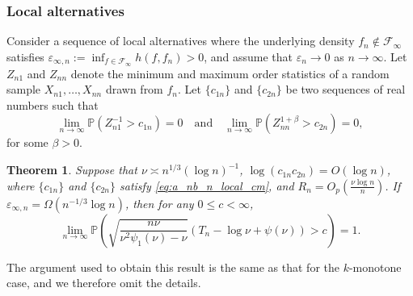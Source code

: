 \documentclass[12pt,letterpaper, twoside, openany]{article}
\theoremstyle{plain}
\newtheorem{theorem}{Theorem}[section]
\begin{document}



	



\subsubsection{Local alternatives}
Consider a sequence of local alternatives where the underlying density $f_n \notin \mathcal{F}_\infty$ satisfies  
$\varepsilon_{\infty,n} := \inf_{f \in \mathcal{F}_\infty} h(f, f_n) > 0$, and assume that $\varepsilon_{n} \to 0$ as $n \to \infty$.  
Let $Z_{n1}$ and $Z_{nn}$ denote the minimum and maximum order statistics of a random sample $X_{n1}, \ldots, X_{nn}$ drawn from $f_n$.  
Let $\{c_{1n}\}$ and $\{c_{2n}\}$ be two sequences of real numbers such that
\begin{equation}\label{eq:a_nb_n_local_cm}
    \lim_{n \to \infty} \mathbb{P}( Z_{n1}^{-1} > c_{1n}) = 0 \quad \text{and} \quad \lim_{n \to \infty} \mathbb{P}(Z_{nn}^{1+\beta} > c_{2n}) = 0,
\end{equation}
for some $\beta > 0$. 

\begin{theorem}\label{coro:c_monotone_H1_local_alt_rate}
    Suppose that $\nu \asymp n^{1/3}(\log n)^{-1}$, $\log (c_{1n} c_{2n}) = O(\log n)$, where $\{c_{1n}\}$ and $\{c_{2n}\}$ satisfy \eqref{eq:a_nb_n_local_cm}, and $R_n = O_p(\frac{\nu \log n}{n})$. If $\varepsilon_{\infty, n} = \Omega(n^{-1/3} \log n)$, then for any $0 \leq c < \infty$,
    \begin{equation*}
\lim_{n \rightarrow \infty} \mathbb{P}     \left(
\sqrt{ \frac{n\nu}{\nu^2\psi_1(\nu)-\nu}} \left( T_n -  \log \nu +  \psi(\nu) \right) > c\right) = 1.
\end{equation*}
\end{theorem}
The argument used to obtain this result is the same as that for the $k$-monotone case, and we therefore omit the details.
\end{document}
